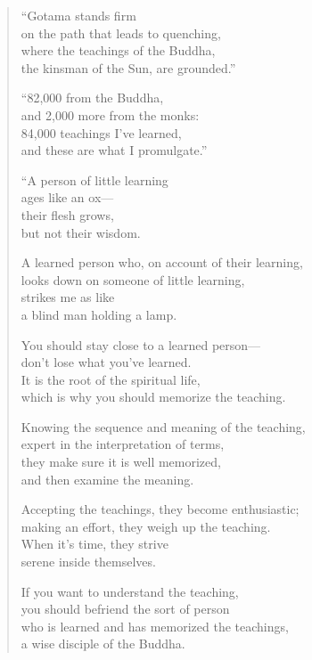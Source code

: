 \documentclass[12pt,openany]{book}%
\begin{document}
\begin{verse}
“Gotama stands firm \\
on the path that leads to quenching, \\
where the teachings of the Buddha, \\
the kinsman of the Sun, are grounded.” 

“82,000 from the Buddha, \\
and 2,000 more from the monks: \\
84,000 teachings I’ve learned, \\
and these are what I promulgate.” 

“A person of little learning \\
ages like an ox—\\
their flesh grows, \\
but not their wisdom. 

A learned person who, on account of their learning, \\
looks down on someone of little learning, \\
strikes me as like \\
a blind man holding a lamp. 

You should stay close to a learned person—\\
don’t lose what you’ve learned. \\
It is the root of the spiritual life, \\
which is why you should memorize the teaching. 

Knowing the sequence and meaning of the teaching, \\
expert in the interpretation of terms, \\
they make sure it is well memorized, \\
and then examine the meaning. 

Accepting the teachings, they become enthusiastic; \\
making an effort, they weigh up the teaching. \\
When it’s time, they strive \\
serene inside themselves. 

If you want to understand the teaching, \\
you should befriend the sort of person \\
who is learned and has memorized the teachings, \\
a wise disciple of the Buddha. 


\end{verse}
\end{document}
